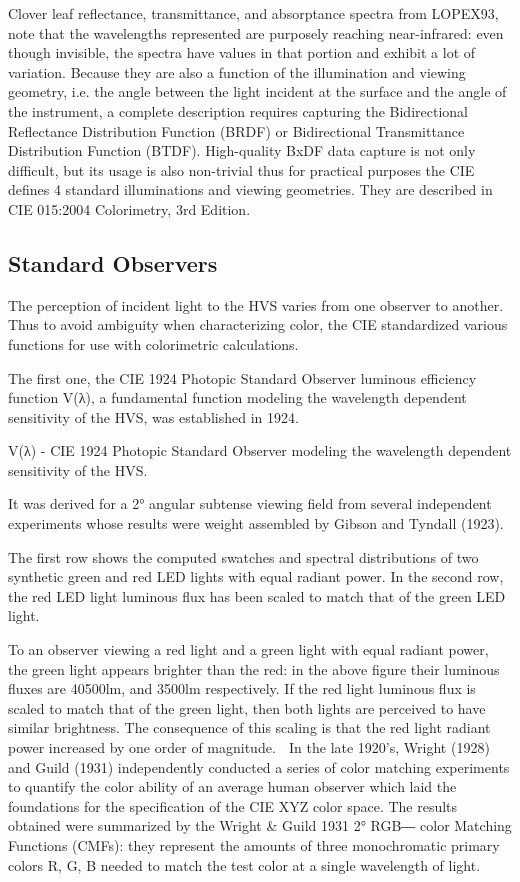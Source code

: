 Clover leaf reflectance, transmittance, and absorptance spectra from LOPEX93, note that the wavelengths represented are purposely reaching near-infrared: even though invisible, the spectra have values in that portion and exhibit a lot of variation.
Because they are also a function of the illumination and viewing geometry, i.e. the angle between the light incident at the surface and the angle of the instrument, a complete description requires capturing the Bidirectional Reflectance Distribution Function (BRDF) or Bidirectional Transmittance Distribution Function (BTDF). High-quality BxDF data capture is not only difficult, but its usage is also non-trivial thus for practical purposes the CIE defines 4 standard illuminations and viewing geometries. They are described in CIE 015:2004 Colorimetry, 3rd Edition. 

\subsection{Standard Observers}

The perception of incident light to the HVS varies from one observer to another. Thus to avoid ambiguity when characterizing color, the CIE standardized various functions for use with colorimetric calculations.

The first one, the CIE 1924 Photopic Standard Observer luminous efficiency function V(λ), a fundamental function modeling the wavelength dependent sensitivity of the HVS, was established in 1924.

V(λ) - CIE 1924 Photopic Standard Observer modeling the wavelength dependent sensitivity of the HVS.

It was derived for a 2° angular subtense viewing field from several independent experiments whose results were weight assembled by Gibson and Tyndall (1923).

The first row shows the computed swatches and spectral distributions of two synthetic green and red LED lights with equal radiant power. In the second row, the red LED light luminous flux has been scaled to match that of the green LED light.

To an observer viewing a red light and a green light with equal radiant power, the green light appears brighter than the red: in the above figure their luminous fluxes are 40500lm, and 3500lm respectively. If the red light luminous flux is scaled to match that of the green light, then both lights are perceived to have similar brightness. The consequence of this scaling is that the red light radiant power increased by one order of magnitude.

In the late 1920's, Wright (1928) and Guild (1931) independently conducted a series of color matching experiments to quantify the color ability of an average human observer which laid the foundations for the specification of the CIE XYZ color space. The results obtained were summarized by the Wright & Guild 1931 2° RGB― color Matching Functions (CMFs): they represent the amounts of three monochromatic primary colors R, G, B needed to match the test color at a single wavelength of light.


